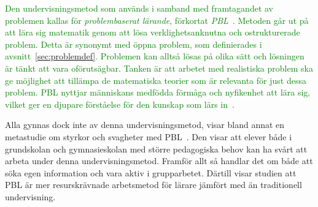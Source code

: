 \textcolor{green}{Den undervisningsmetod som används i samband med framtagandet av problemen kallas för \textit{problembaserat lärande}, förkortat \textit{PBL}~\cite{PBLdefinition}. Metoden går ut på att lära sig matematik genom att lösa verklighetsanknutna och ostrukturerade problem. Detta är synonymt med öppna problem, som definierades i avsnitt~\ref{sec:problemdef}. Problemen kan alltså lösas på olika sätt och lösningen är tänkt att vara oförutsägbar. Tanken är att arbetet med realistiska problem ska ge möjlighet att tillämpa de matematiska teorier som är relevanta för just dessa problem. PBL nyttjar människans medfödda förmåga och nyfikenhet att lära sig, vilket ger en djupare förståelse för den kunskap som lärs in~\cite{djupareKunskapPBL}.}

\textcolor{Mahogany}{Alla gynnas dock inte av denna undervisningsmetod, visar bland annat en metastudie om styrkor och svagheter med PBL~\cite{Metastudie}. Den visar att elever både i grundskolan och gymnasieskolan med större pedagogiska behov kan ha svårt att arbeta under denna undervisningsmetod. Framför allt så handlar det om både att söka egen information och vara aktiv i grupparbetet. Därtill visar studien att PBL är mer resurskrävnade arbetsmetod för lärare jämfört med än traditionell undervisning.
}



